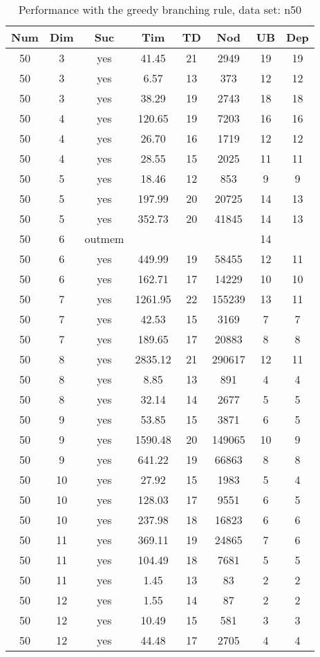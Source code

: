 \begin{table}[!htb]
  \centering
  \begin{tabular}[center]{|c|c|c|c|c|c|c|c|}
    \hline
    Num & Dim & Suc & Tim & TD & Nod & UB & Dep \\
    \hline
    50 & 3 & yes & 41.45 & 21 & 2949 & 19 & 19 \\
    50 & 3 & yes & 6.57 & 13 & 373 & 12 & 12 \\
    50 & 3 & yes & 38.29 & 19 & 2743 & 18 & 18 \\
    50 & 4 & yes & 120.65 & 19 & 7203 & 16 & 16 \\
    50 & 4 & yes & 26.70 & 16 & 1719 & 12 & 12 \\
    50 & 4 & yes & 28.55 & 15 & 2025 & 11 & 11 \\
    50 & 5 & yes & 18.46 & 12 & 853 & 9 & 9 \\
    50 & 5 & yes & 197.99 & 20 & 20725 & 14 & 13 \\
    50 & 5 & yes & 352.73 & 20 & 41845 & 14 & 13 \\
    50 & 6 & outmem &  &  &  & 14 &  \\
    50 & 6 & yes & 449.99 & 19 & 58455 & 12 & 11 \\
    50 & 6 & yes & 162.71 & 17 & 14229 & 10 & 10 \\
    50 & 7 & yes & 1261.95 & 22 & 155239 & 13 & 11 \\
    50 & 7 & yes & 42.53 & 15 & 3169 & 7 & 7 \\
    50 & 7 & yes & 189.65 & 17 & 20883 & 8 & 8 \\
    50 & 8 & yes & 2835.12 & 21 & 290617 & 12 & 11 \\
    50 & 8 & yes & 8.85 & 13 & 891 & 4 & 4 \\
    50 & 8 & yes & 32.14 & 14 & 2677 & 5 & 5 \\
    50 & 9 & yes & 53.85 & 15 & 3871 & 6 & 5 \\
    50 & 9 & yes & 1590.48 & 20 & 149065 & 10 & 9 \\
    50 & 9 & yes & 641.22 & 19 & 66863 & 8 & 8 \\
    50 & 10 & yes & 27.92 & 15 & 1983 & 5 & 4 \\
    50 & 10 & yes & 128.03 & 17 & 9551 & 6 & 5 \\
    50 & 10 & yes & 237.98 & 18 & 16823 & 6 & 6 \\
    50 & 11 & yes & 369.11 & 19 & 24865 & 7 & 6 \\
    50 & 11 & yes & 104.49 & 18 & 7681 & 5 & 5 \\
    50 & 11 & yes & 1.45 & 13 & 83 & 2 & 2 \\
    50 & 12 & yes & 1.55 & 14 & 87 & 2 & 2 \\
    50 & 12 & yes & 10.49 & 15 & 581 & 3 & 3 \\
    50 & 12 & yes & 44.48 & 17 & 2705 & 4 & 4 \\
    \hline
  \end{tabular}
  \caption{Performance with the greedy branching rule, data set: n50}
  \label{tab:test.cutmds-n50}
\end{table}

